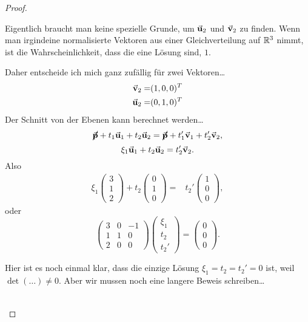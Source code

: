 \begin{proof}
\begin{parts}
		\begin{Remark}
			Eigentlich braucht man keine spezielle Grunde, um $\va u_2$ und $\va v_2$ zu finden. Wenn man irgindeine normalisierte Vektoren aus einer Gleichverteilung auf $\mathbb{R}^3$ nimmt, ist die Wahrscheinlichkeit, dass die eine L\"{o}sung sind, $1$.
		\end{Remark}
		Daher entscheide ich mich ganz zufällig f\"{u}r zwei Vektoren\ldots
		\begin{align*}
			\va v_2=&(1,0,0)^T\\
			\va u_2=&(0,1,0)^T
		\end{align*}
			Der Schnitt von der Ebenen kann berechnet werden\ldots
		\[
			\cancel{\va p}+t_1\va u_1+t_2\va u_2=\cancel{\va p}+t_1'\va v_1+t_2'\va v_2
		,\]
		\[
		\xi_1\va u_1+t_2\va u_2=t_2'\va v_2
		.\] 
		Also
		\begin{align*}
			\xi_1 \begin{pmatrix} 3 \\ 1 \\ 2 \end{pmatrix} +t_2 \begin{pmatrix} 0 \\ 1 \\ 0 \end{pmatrix} =&t_2'\begin{pmatrix} 1 \\ 0 \\ 0 \end{pmatrix}, 
		\end{align*}
		oder
		\[
			\begin{pmatrix} 3 & 0 & -1 \\ 1 & 1 & 0 \\ 2 & 0 & 0 \end{pmatrix} \begin{pmatrix} \xi_1\\ t_2\\ t_2' \end{pmatrix} =\begin{pmatrix} 0 \\ 0 \\ 0 \end{pmatrix} 
		.\]
		\begin{Remark}
			Hier ist es noch einmal klar, dass die einzige Lösung $\xi_1=t_2=t_2'=0$ ist, weil $\det(\dots)\neq 0$. Aber wir mussen noch eine langere Beweis schreiben\ldots
		\end{Remark}
\begin{gather*}

\end{gather*}
\end{parts}
\end{proof}
